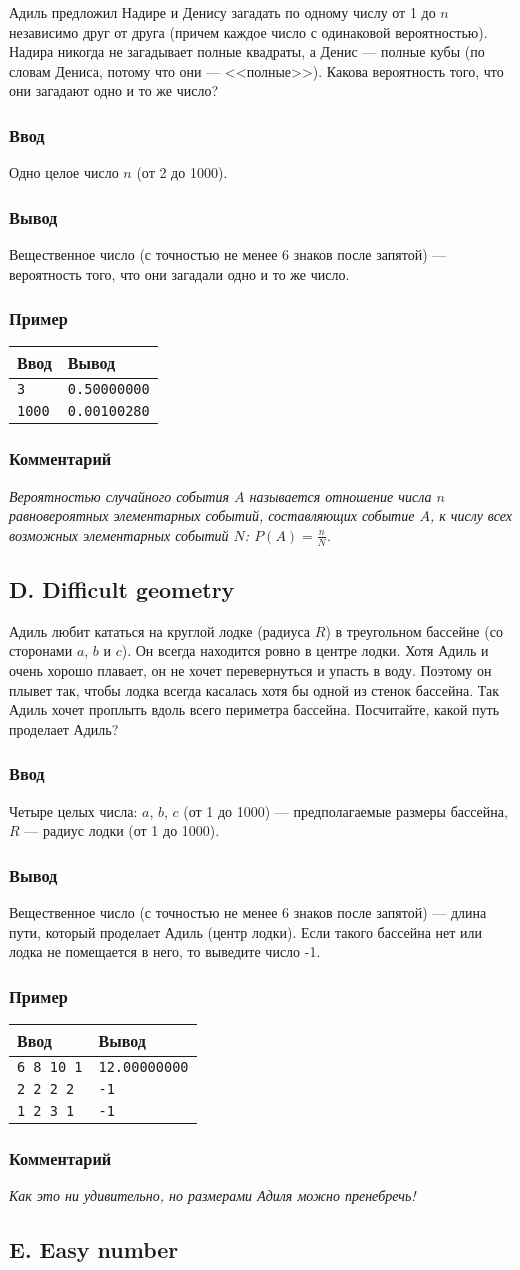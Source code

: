 \documentclass[10pt, a4paper]{article}
\newcommand{\informat}[1]
{
	\subsubsection*{Ввод} #1
}
\newcommand{\outformat}[1]
{
	\subsubsection*{Вывод} #1
}
\newcommand{\examplee}[4]
{
	\subsubsection*{Пример}
	\noindent
	\begin{center}
	\begin{tabularx}{\linewidth}{|X|X|}
	\hline
	Ввод 	& Вывод  	\\
	\hline
	{\tt #1} & {\tt #2}	\\
	\hline
	{\tt #3} & {\tt #4}	\\
	\hline
	\end{tabularx}
	\end{center}
}
\newcommand{\exampleee}[6]
{
	\subsubsection*{Пример}
	\noindent
	\begin{center}
	\begin{tabularx}{\linewidth}{|X|X|}
	\hline
	Ввод 	& Вывод  	\\
	\hline
	{\tt #1} & {\tt #2}	\\
	\hline
	{\tt #3} & {\tt #4}	\\
	\hline
	{\tt #5} & {\tt #6}	\\
	\hline
	\end{tabularx}
	\end{center}
}
\newcommand{\excomm}[1]
{
	\subsubsection*{Комментарий}
	\textit{#1}
}
\begin{document}
Адиль предложил Надире и Денису загадать по одному числу от 1 до $n$ независимо друг от друга (причем каждое число с одинаковой вероятностью). Надира никогда не загадывает полные квадраты, а Денис --- полные кубы (по словам Дениса, потому что они --- <<полные>>). Какова вероятность того, что они загадают одно и то же число?

\informat{Одно целое число $n$ (от 2 до 1000).}

\outformat{Вещественное число (с точностью не менее 6 знаков после запятой) --- вероятность того, что они загадали одно и то же число. }

\examplee{3}{0.50000000}{1000}{0.00100280}

\excomm{Вероятностью случайного события $A$ называется отношение числа $n$ равновероятных элементарных событий, составляющих событие $A$, к числу всех возможных элементарных событий $N$: $P(A)= \frac{n}{N}$.}



\subsection*{D. Difficult geometry}

Адиль любит кататься на круглой лодке (радиуса $R$) в треугольном бассейне (со сторонами $a$, $b$ и $c$). Он всегда находится ровно в центре лодки. Хотя Адиль и очень хорошо плавает, он не хочет перевернуться и упасть в воду. Поэтому он плывет так, чтобы лодка всегда касалась хотя бы одной из стенок бассейна. Так Адиль хочет проплыть вдоль всего периметра бассейна. Посчитайте, какой путь проделает Адиль?

\informat{Четыре целых числа: $a$, $b$, $c$  (от 1 до 1000) --- предполагаемые размеры бассейна, $R$ --- радиус лодки (от 1 до 1000).}

\outformat {Вещественное число (с точностью не менее 6 знаков после запятой) --- длина пути, который проделает Адиль (центр лодки). Если такого бассейна нет или лодка не помещается в него, то выведите число -1.}

\exampleee{6 8 10 1}{12.00000000}{2 2 2 2}{-1}{1 2 3 1}{-1}

\excomm{Как это ни удивительно, но размерами Адиля можно пренебречь!}



\subsection*{E. Easy number}
\end{document}
